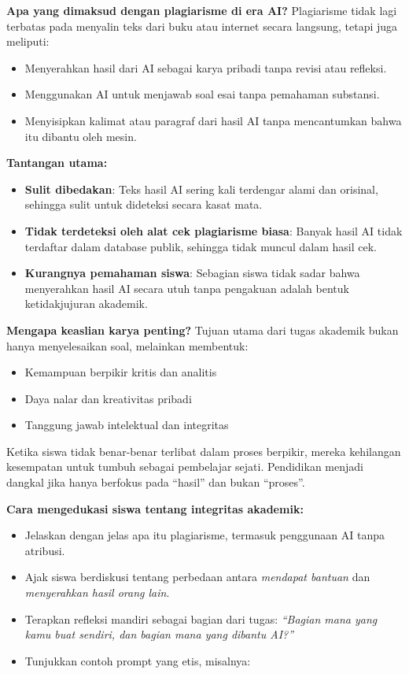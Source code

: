 \textbf{Apa yang dimaksud dengan plagiarisme di era AI?}  
Plagiarisme tidak lagi terbatas pada menyalin teks dari buku atau internet secara langsung, tetapi juga meliputi:
\begin{itemize}
	\item Menyerahkan hasil dari AI sebagai karya pribadi tanpa revisi atau refleksi.
	\item Menggunakan AI untuk menjawab soal esai tanpa pemahaman substansi.
	\item Menyisipkan kalimat atau paragraf dari hasil AI tanpa mencantumkan bahwa itu dibantu oleh mesin.
\end{itemize}

\textbf{Tantangan utama:}
\begin{itemize}
	\item \textbf{Sulit dibedakan}: Teks hasil AI sering kali terdengar alami dan orisinal, sehingga sulit untuk dideteksi secara kasat mata.
	\item \textbf{Tidak terdeteksi oleh alat cek plagiarisme biasa}: Banyak hasil AI tidak terdaftar dalam database publik, sehingga tidak muncul dalam hasil cek.
	\item \textbf{Kurangnya pemahaman siswa}: Sebagian siswa tidak sadar bahwa menyerahkan hasil AI secara utuh tanpa pengakuan adalah bentuk ketidakjujuran akademik.
\end{itemize}

\textbf{Mengapa keaslian karya penting?}  
Tujuan utama dari tugas akademik bukan hanya menyelesaikan soal, melainkan membentuk:
\begin{itemize}
	\item Kemampuan berpikir kritis dan analitis
	\item Daya nalar dan kreativitas pribadi
	\item Tanggung jawab intelektual dan integritas
\end{itemize}

Ketika siswa tidak benar-benar terlibat dalam proses berpikir, mereka kehilangan kesempatan untuk tumbuh sebagai pembelajar sejati. Pendidikan menjadi dangkal jika hanya berfokus pada “hasil” dan bukan “proses”.

\textbf{Cara mengedukasi siswa tentang integritas akademik:}
\begin{itemize}
	\item Jelaskan dengan jelas apa itu plagiarisme, termasuk penggunaan AI tanpa atribusi.
	\item Ajak siswa berdiskusi tentang perbedaan antara \textit{mendapat bantuan} dan \textit{menyerahkan hasil orang lain}.
	\item Terapkan refleksi mandiri sebagai bagian dari tugas: \textit{“Bagian mana yang kamu buat sendiri, dan bagian mana yang dibantu AI?”}
	\item Tunjukkan contoh prompt yang etis, misalnya:
\end{itemize}

